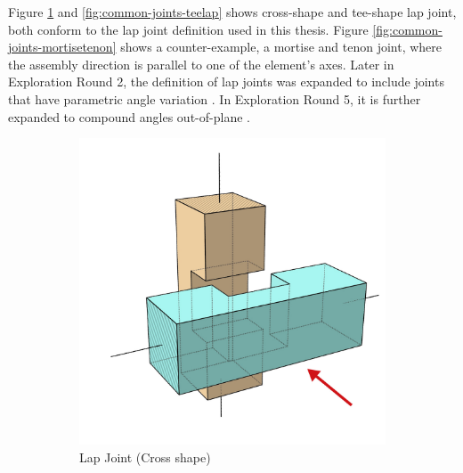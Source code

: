 Figure \ref{fig:common-joints-crosslap} and \ref{fig:common-joints-teelap} shows cross-shape and tee-shape lap joint, both conform to the lap joint definition used in this thesis. Figure \ref{fig:common-joints-mortisetenon} shows a counter-example, a mortise and tenon joint, where the assembly direction is parallel to one of the element’s axes. Later in Exploration Round 2, the definition of lap joints was expanded to include joints that have parametric angle variation . In Exploration Round 5, it is further expanded to compound angles out-of-plane .

\begin{figure}[H]
     \centering
     \begin{subfigure}[b]{0.32\textwidth}
         \centering
         \includegraphics[width=\textwidth]{images/04-1+2/CrossLap_6_witharrows.jpg}
         \caption{Lap Joint (Cross shape)}
         \label{fig:common-joints-crosslap}
     \end{subfigure}
     \hfill
     \begin{subfigure}[b]{0.32\textwidth}
         \centering

\end{subfigure}
\end{figure}
